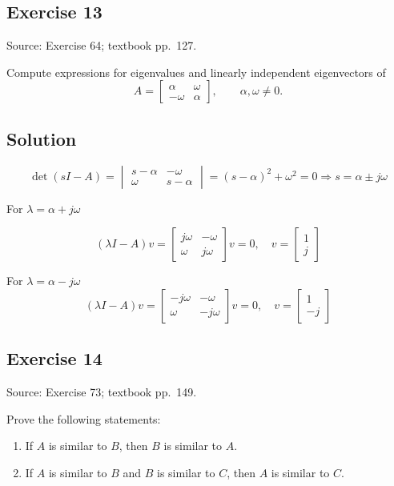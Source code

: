 \documentclass[12pt,a4paper]{article}
\newlength{\questionroom}
\newenvironment{questionprompt}{%
  \begin{lrbox}{\questionbox}\begin{minipage}{\linewidth}%
}{%
  \end{minipage}\end{lrbox}%
  \setlength{\questionroom}{\dimexpr\ht\questionbox+\dp\questionbox+5.2cm\relax}%
  \ifdim\questionroom>\textheight\setlength{\questionroom}{\textheight}\fi
  \Needspace{\questionroom}%
  \noindent\usebox{\questionbox}\par
}
\begin{document}
\begin{questionprompt}
\section*{Exercise 13}
\label{practice:13}
{\small Source: Exercise 64; textbook pp.~127.}\par
Compute expressions for eigenvalues and linearly independent eigenvectors of
\[A=\begin{bmatrix}\alpha&\omega\\-\omega&\alpha\end{bmatrix},\qquad\alpha,\omega\ne0.\]
\end{questionprompt}
\subsection*{Solution}

\[
\det (sI - A) = \begin{vmatrix}
	s - \alpha & -\omega \\
	\omega & s - \alpha 
\end{vmatrix} = (s-\alpha)^2 + \omega^2 = 0 \Rightarrow s = \alpha \pm j\omega
\]

For $\lambda = \alpha + j\omega$

\[
(\lambda I - A)v = \begin{bmatrix}
	j\omega & -\omega \\ \omega & j\omega
\end{bmatrix}v = 0, \quad v = \begin{bmatrix}
1 \\ j
\end{bmatrix}
\]

For $\lambda = \alpha - j\omega$
\[
(\lambda I - A) v = \begin{bmatrix}
	-j\omega & -\omega \\ \omega & -j\omega  
\end{bmatrix}v = 0, \quad v = \begin{bmatrix}
1 \\ -j
\end{bmatrix}  
\]
\vspace{3.5cm}


\begin{questionprompt}
\section*{Exercise 14}
\label{practice:14}
{\small Source: Exercise 73; textbook pp.~149.}\par
Prove the following statements:
\begin{enumerate}[label=(\alph*)]
\item If $A$ is similar to $B$, then $B$ is similar to $A$.
\item If $A$ is similar to $B$ and $B$ is similar to $C$, then $A$ is similar to $C$.
\end{enumerate}
\end{questionprompt}
\end{document}
